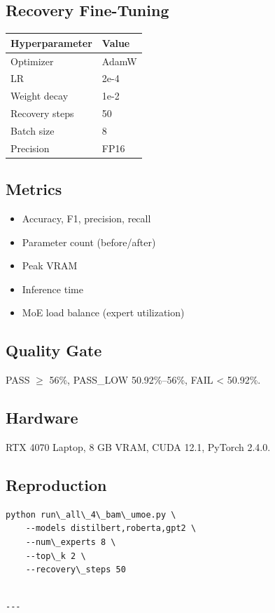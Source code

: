 \subsection{Recovery Fine-Tuning}

\begin{table}[H]
\centering
\small
\begin{tabular}{ll}
\toprule
\textbf{Hyperparameter} & \textbf{Value} \\
\midrule
Optimizer & AdamW \\
LR & 2e-4 \\
Weight decay & 1e-2 \\
Recovery steps & 50 \\
Batch size & 8 \\
Precision & FP16 \\
\bottomrule
\end{tabular}
\end{table}

\subsection{Metrics}

\begin{itemize}
\item Accuracy, F1, precision, recall
\item Parameter count (before/after)
\item Peak VRAM
\item Inference time
\item MoE load balance (expert utilization)

\end{itemize}
\subsection{Quality Gate}

PASS $\ge$ 56\%, PASS\_LOW 50.92\%--56\%, FAIL \textless{} 50.92\%.

\subsection{Hardware}

RTX 4070 Laptop, 8 GB VRAM, CUDA 12.1, PyTorch 2.4.0.

\subsection{Reproduction}

\begin{lstlisting}
python run\_all\_4\_bam\_umoe.py \
    --models distilbert,roberta,gpt2 \
    --num\_experts 8 \
    --top\_k 2 \
    --recovery\_steps 50
\end{lstlisting}
\begin{lstlisting}

---
\end{lstlisting}